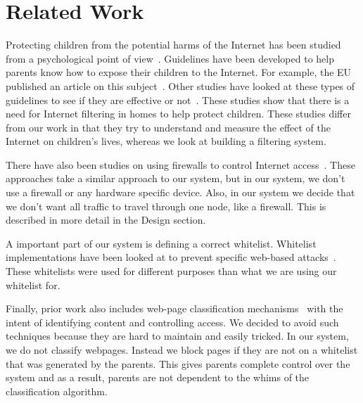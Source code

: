 
\section{Related Work}

Protecting children from the potential harms of the Internet has been studied
from a psychological point of view~\cite{ybarra2005exposure, ho_statistical}.
Guidelines have been developed to help parents know how to expose their
children to the Internet. For example, the EU published an article on this
subject~\cite{holloway2013zero, livingstone2010risks}. Other studies have
looked at these types of guidelines to see if they are effective or
not~\cite{livingstone2008parental}. These studies show that there is a need for
Internet filtering in homes to help protect children. These studies differ from
our work in that they try to understand and measure the effect of the Internet
on children's lives, whereas we look at building a filtering system.

There have also been studies on using firewalls to control Internet
access~\cite{ivanovic, nguyen}. These approaches take a similar approach to
our system, but in our system, we don't use a firewall or any hardware specific
device. Also, in our system we decide that we don't want all traffic to travel
through one node, like a firewall. This is described in more detail in the
Design section.

A important part of our system is defining a correct whitelist. Whitelist
implementations have been looked at to prevent specific web-based
attacks~\cite{han_automated_whitelist, iha_implementation}. These whitelists
were used for different purposes than what we are using our whitelist for.

Finally, prior work also includes web-page classification
mechanisms~\cite{baykan_et_al_url_based_classification,
chen_et_al_novel_web_page_filtering, ho_statistical} with the intent of
identifying content and controlling access. We decided to avoid such techniques
because they are hard to maintain and easily tricked. In our system, we do not
classify webpages. Instead we block pages if they are not on a whitelist that
was generated by the parents.  This gives parents complete control over the
system and as a result, parents are not dependent to the whims of the
classification algorithm.
